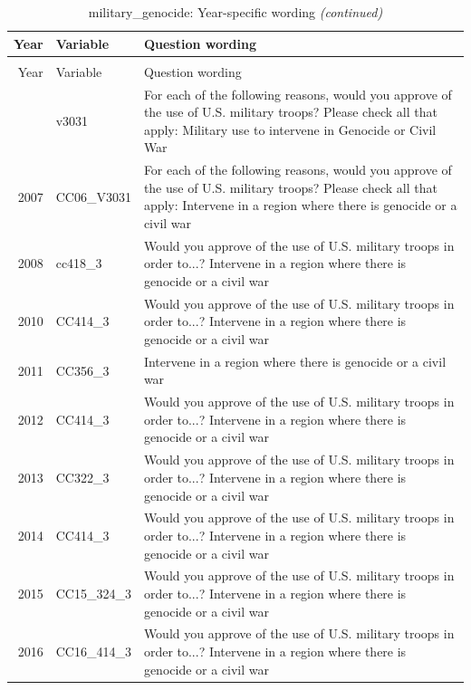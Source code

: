 \documentclass[12pt]{article}
\begin{document}
\begin{longtable}[t]{rl>{\raggedright\arraybackslash}p{10cm}}
\caption{\label{tab:unnamed-chunk-4}military\_genocide: Year-specific wording}\\
\toprule
Year & Variable & Question wording\\
\midrule
\endfirsthead
\caption[]{military\_genocide: Year-specific wording \textit{(continued)}}\\
\toprule
Year & Variable & Question wording\\
\midrule
\endhead
\
\endfoot
\bottomrule
\endlastfoot
2006 & v3031 & For each of the following reasons, would you approve of the use of U.S. military troops? Please check all that apply: Military use to intervene in Genocide or Civil War\\
2007 & CC06\_V3031 & For each of the following reasons, would you approve of the use of U.S. military troops? Please check all that apply: Intervene in a region where there is genocide or a civil war\\
2008 & cc418\_3 & Would you approve of the use of U.S. military troops in order to...? Intervene in a region where there is genocide or a civil war\\
2010 & CC414\_3 & Would you approve of the use of U.S. military troops in order to...? Intervene in a region where there is genocide or a civil war\\
2011 & CC356\_3 & Intervene in a region where there is genocide or a civil war\\
2012 & CC414\_3 & Would you approve of the use of U.S. military troops in order to...? Intervene in a region where there is genocide or a civil war\\
2013 & CC322\_3 & Would you approve of the use of U.S. military troops in order to...? Intervene in a region where there is genocide or a civil war\\
2014 & CC414\_3 & Would you approve of the use of U.S. military troops in order to...? Intervene in a region where there is genocide or a civil war\\
2015 & CC15\_324\_3 & Would you approve of the use of U.S. military troops in order to...? Intervene in a region where there is genocide or a civil war\\
2016 & CC16\_414\_3 & Would you approve of the use of U.S. military troops in order to...? Intervene in a region where there is genocide or a civil war\\*
\end{longtable}
\end{document}
